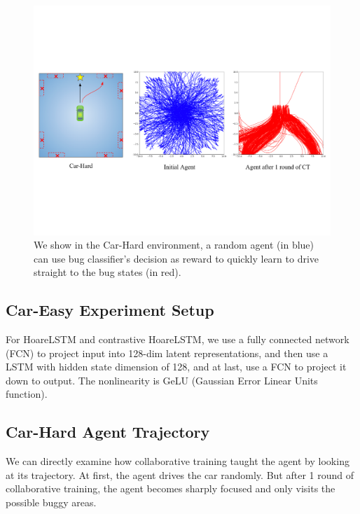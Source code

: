 \documentclass{article}
\begin{document}
\begin{figure}[ht]
	\centering
	\includegraphics[width=\linewidth]{images/ct_trajectory.pdf}
	\caption{We show in the Car-Hard environment, a random agent (in blue) can use bug classifier's decision as reward to quickly learn to drive straight to the bug states (in red).}
	\label{fig:ct_trajectory}
\end{figure}


\subsection{Car-Easy Experiment Setup}
\label{sec:app-car-easy-exp-setup}

For HoareLSTM and contrastive HoareLSTM, we use a fully connected network (FCN) to project input into 128-dim latent representations, and then use a LSTM with hidden state dimension of 128, and at last, use a FCN to project it down to output. The nonlinearity is GeLU (Gaussian Error Linear Units function). 

\subsection{Car-Hard Agent Trajectory}

We can directly examine how collaborative training taught the agent by looking at its trajectory. At first, the agent drives the car randomly. But after 1 round of collaborative training, the agent becomes sharply focused and only visits the possible buggy areas.
\end{document}
